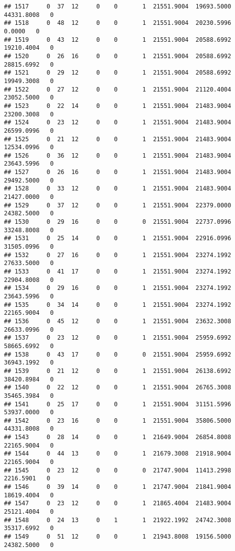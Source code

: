 \documentclass[
]{article}
\begin{document}
\begin{enumerate}
\begin{verbatim}
## 1517     0  37  12     0    0       1  21551.9004  19693.5000  44331.8008   0
## 1518     0  48  12     0    0       1  21551.9004  20230.5996      0.0000   0
## 1519     0  43  12     0    0       1  21551.9004  20588.6992  19210.4004   0
## 1520     0  26  16     0    0       1  21551.9004  20588.6992  28815.6992   0
## 1521     0  29  12     0    0       1  21551.9004  20588.6992  19949.3008   0
## 1522     0  27  12     0    0       1  21551.9004  21120.4004  23052.5000   0
## 1523     0  22  14     0    0       1  21551.9004  21483.9004  23200.3008   0
## 1524     0  23  12     0    0       1  21551.9004  21483.9004  26599.0996   0
## 1525     0  21  12     0    0       1  21551.9004  21483.9004  12534.0996   0
## 1526     0  36  12     0    0       1  21551.9004  21483.9004  23643.5996   0
## 1527     0  26  16     0    0       1  21551.9004  21483.9004  29492.5000   0
## 1528     0  33  12     0    0       1  21551.9004  21483.9004  21427.0000   0
## 1529     0  37  12     0    0       1  21551.9004  22379.0000  24382.5000   0
## 1530     0  29  16     0    0       0  21551.9004  22737.0996  33248.8008   0
## 1531     0  25  14     0    0       1  21551.9004  22916.0996  31505.0996   0
## 1532     0  27  16     0    0       1  21551.9004  23274.1992  27633.5000   0
## 1533     0  41  17     0    0       1  21551.9004  23274.1992  22904.8008   0
## 1534     0  29  16     0    0       1  21551.9004  23274.1992  23643.5996   0
## 1535     0  34  14     0    0       1  21551.9004  23274.1992  22165.9004   0
## 1536     0  45  12     0    0       1  21551.9004  23632.3008  26633.0996   0
## 1537     0  23  12     0    0       1  21551.9004  25959.6992  58665.6992   0
## 1538     0  43  17     0    0       0  21551.9004  25959.6992  36943.1992   0
## 1539     0  21  12     0    0       1  21551.9004  26138.6992  38420.8984   0
## 1540     0  22  12     0    0       1  21551.9004  26765.3008  35465.3984   0
## 1541     0  25  17     0    0       1  21551.9004  31151.5996  53937.0000   0
## 1542     0  23  16     0    0       1  21551.9004  35806.5000  44331.8008   0
## 1543     0  28  14     0    0       1  21649.9004  26854.8008  22165.9004   0
## 1544     0  44  13     0    0       1  21679.3008  21918.9004  22165.9004   0
## 1545     0  23  12     0    0       0  21747.9004  11413.2998   2216.5901   0
## 1546     0  39  14     0    0       1  21747.9004  21841.9004  18619.4004   0
## 1547     0  23  12     0    0       1  21865.4004  21483.9004  25121.4004   0
## 1548     0  24  13     0    1       1  21922.1992  24742.3008  35317.6992   0
## 1549     0  51  12     0    0       1  21943.8008  19156.5000  24382.5000   0

\end{verbatim}
\end{enumerate}
\end{document}
